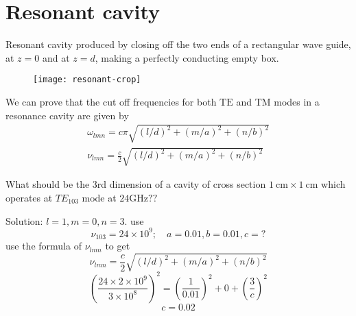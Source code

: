\section{Resonant cavity}
Resonant cavity produced by closing off the two ends of a rectangular wave guide, at $z=0$ and at $z=d$, making a perfectly conducting empty box.\\
\begin{figure}[H]
	\centering
	\texttt{[image: resonant-crop]}
	\caption{}
	\label{}
\end{figure}
We can prove that the cut off frequencies for both $\mathrm{TE}$ and TM modes in a resonance cavity are given by
$$\begin{gathered}
\omega_{l m n}=c \pi \sqrt{(l / d)^{2}+(m / a)^{2}+(n / b)^{2}} \\
\nu_{l m n}=\frac{c}{2} \sqrt{(l / d)^{2}+(m / a)^{2}+(n / b)^{2}}
\end{gathered}$$
\begin{exercise}
	 What should be the 3rd dimension of a cavity of cross section $1 \mathrm{~cm} \times 1 \mathrm{~cm}$ which operates at $T E_{103}$ mode at $24 \mathrm{GHz} ? ?$
\end{exercise}
\begin{answer}
Solution: $l=1, m=0, n=3$. use
$$
\nu_{103}=24 \times 10^{9} ; \quad a=0.01, b=0.01, c=?
$$
use the formula of $\nu_{l m n}$ to get
$$\nu_{l m n}=\frac{c}{2} \sqrt{(l / d)^{2}+(m / a)^{2}+(n / b)^{2}}$$
$$
\left(\frac{24 \times 2 \times 10^{9}}{3 \times 10^{8}}\right)^{2}=\left(\frac{1}{0.01}\right)^{2}+0+\left(\frac{3}{c}\right)^{2}
$$
$$c=0.02$$	
\end{answer}
